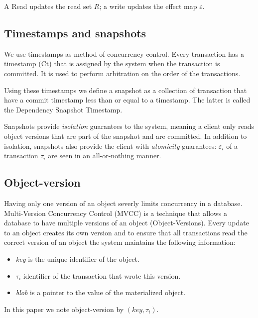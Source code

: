 \documentclass[systeme,french,english]{compas2022}
\begin{document}
A Read updates the read set $R$; a write updates the effect map $\varepsilon$.


\subsection{Timestamps and snapshots}

We use timestamps as method of concurrency control.
Every transaction has a timestamp (Ct) that is assigned by the system when the transaction is committed.
It is used to perform arbitration on the order of the transactions.

Using these timestamps we define a snapshot as a collection of transaction that have a commit timestamp less than or equal to a timestamp.
The latter is called the Dependency Snapshot Timestamp.

Snapshots provide \emph{isolation} guarantees to the system, meaning a client only reads object versions that are part of the snapshot and are committed. 
In addition to isolation, snapshots also provide the client with \emph{atomicity} guarantees: $\varepsilon_i$ of a transaction $\tau_i$ are seen in an all-or-nothing manner.

\subsection{Object-version}

Having only one version of an object severly limits concurrency in a database.
Multi-Version Concurrency Control (MVCC) is a technique that allows a database to have multiple versions of an object (Object-Versions).
Every update to an object creates its own version and to ensure that all transactions read the correct version of an object the system maintains the following information: 
\begin{itemize}
  \item \emph{key} is the unique identifier of the object.
  \item \emph{$\tau_i$} identifier of the transaction that wrote this version.
  \item \emph{blob} is a pointer to the value of the materialized object.
\end{itemize}

In this paper we note object-version by $(key ,\tau_i)$.

\end{document}
